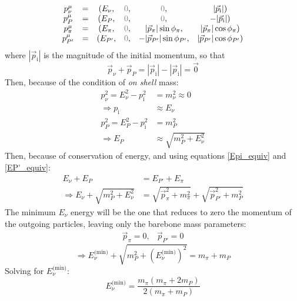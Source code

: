 \documentclass[]{article}
\numberwithin{equation}{section}
\newcommand{\0}{\textcolor{gray}{0}}
\begin{document}
\begin{equation}
	\begin{matrix}
			p^\mu_\nu	&= &(E_\nu,		&\0, &\0, 							&|\vec{p}_\text{i}|)\\
			p^\mu_P 	&= &(E_P,		&\0, &\0,							&-|\vec{p}_\text{i}|)\\
			p^\mu_\pi 	&= &(E_\pi,		&\0, &|\vec{p}_\pi|\sin\phi_{\pi},	&|\vec{p}_\pi|\cos\phi_{\pi})\\
			p^\mu_{P'}	&= &(E_{P'},	&\0, &-|\vec{p}_{P'}|\sin\phi_{P'},	&|\vec{p}_{P'}|\cos\phi_{P'})
		\end{matrix}
\end{equation}
where \(|\vec{p}_\text{i}|\) is the magnitude of the initial momentum, so that
\begin{equation}
	\vec{p}_\nu + \vec{p}_P = |\vec{p}_\text{i}| - |\vec{p}_\text{i}| = \vec{0}
\end{equation}
Then, because of the condition of \textit{on shell} mass:
\begin{align}
	p_\nu^2 = E_\nu^2 - p_\text{i}^2 &= m_\nu^2 \approx 0\nonumber\\
	\Rightarrow p_\text{i} &\approx E_\nu\label{pi_Enu}\\
	p_P^2 = E_P^2 - p_\text{i}^2 &= m_P^2\nonumber\\
	\Rightarrow E_P &\approx \sqrt{m_P^2 + E_\nu^2}\label{EP}
\end{align}
Then, because of conservation of energy, and using equations \ref{Epi_equiv} and \ref{EP'_equiv}:
\begin{align*}
	E_\nu + E_P &= E_{P'} + E_\pi\\
	\Rightarrow E_\nu + \sqrt{m_P^2 + E_\nu^2} &= \sqrt{\vec{p}_\pi^2 + m_\pi^2} + \sqrt{\vec{p}_{P'}^2 + m_P^2}
\end{align*}
The minimum \(E_\nu\) energy will be the one that reduces to zero the momentum of the outgoing particles, leaving only the barebone mass parameters:
\begin{equation*}
	\begin{matrix}
		\vec{p}_\pi = 0,& \vec{p}_{P'} = 0
	\end{matrix}
\end{equation*}
\begin{equation*}
	\Rightarrow E^\text{(min)}_\nu + \sqrt{m_P^2 + \left(E^\text{(min)}_\nu\right)^2} = m_\pi + m_P
\end{equation*}
Solving for \(E^\text{(min)}_\nu\):
\begin{equation}
	E^\text{(min)}_\nu = \frac{m_\pi (m_\pi + 2 m_P)}{2 (m_\pi + m_P)}
\end{equation}
\end{document}
